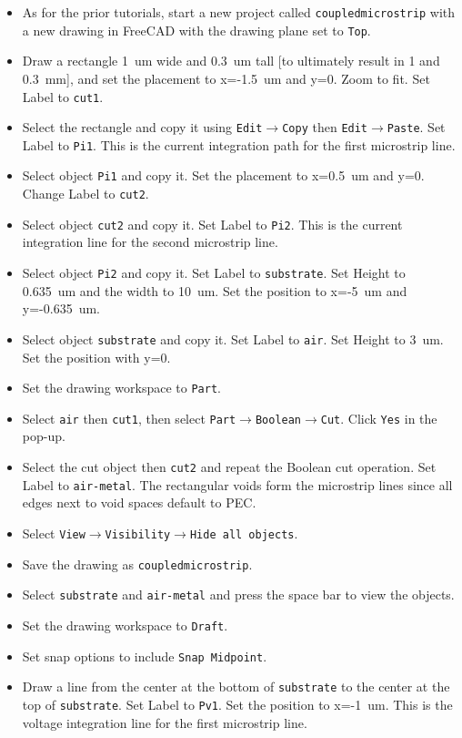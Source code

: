 \documentclass[titlepage]{article}
\renewcommand\_{\textunderscore\linebreak[1]}
\begin{document}
\begin{itemize}
\item As for the prior tutorials, start a new project called \texttt{coupled\_microstrip} with a new drawing in FreeCAD with the drawing plane set to \texttt{Top}.
\item Draw a rectangle 1~um wide and 0.3~um tall [to ultimately result in 1 and 0.3~mm], and set the placement to x=-1.5~um and y=0.  Zoom to fit. Set Label to \texttt{cut1}.
\item Select the rectangle and copy it using \texttt{Edit}$\rightarrow$\texttt{Copy} then \texttt{Edit}$\rightarrow$\texttt{Paste}.  Set Label to \texttt{\_Pi1}.  This is the current integration path for the first microstrip line.
\item Select object \texttt{\_Pi1} and copy it.  Set the placement to x=0.5~um and y=0. Change Label to \texttt{cut2}.
\item Select object \texttt{cut2} and copy it.  Set Label to \texttt{\_Pi2}.  This is the current integration line for the second microstrip line.
\item Select object \texttt{\_Pi2} and copy it.  Set Label to \texttt{substrate}. Set Height to 0.635~um and the width to 10~um.  Set the position to x=-5~um and y=-0.635~um.
\item Select object \texttt{substrate} and copy it.  Set Label to \texttt{air}.  Set Height to 3~um. Set the position with y=0.
\item Set the drawing workspace to \texttt{Part}.
\item Select \texttt{air} then \texttt{cut1}, then select \texttt{Part}$\rightarrow$\texttt{Boolean}$\rightarrow$\texttt{Cut}.  Click \texttt{Yes} in the pop-up.
\item Select the cut object then \texttt{cut2} and repeat the Boolean cut operation. Set Label to \texttt{air-metal}.  The rectangular voids form the microstrip lines since all edges next to void spaces default to PEC.
\item Select \texttt{View}$\rightarrow$\texttt{Visibility}$\rightarrow$\texttt{Hide all objects}.
\item Save the drawing as \texttt{coupled\_microstrip}.
\item Select \texttt{substrate} and \texttt{air-metal} and press the space bar to view the objects.
\item Set the drawing workspace to \texttt{Draft}. 
\item Set snap options to include \texttt{Snap Midpoint}.
\item Draw a line from the center at the bottom of \texttt{substrate} to the center at the top of \texttt{substrate}.  Set Label to \texttt{\_Pv1}. Set the position to x=-1~um.  This is the voltage integration line for the first microstrip line.

\end{itemize}
\end{document}
